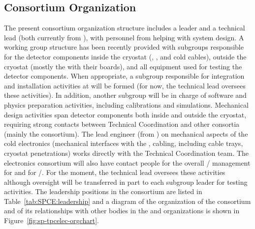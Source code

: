 \subsection{Consortium Organization}
\label{sec:fdsp-tpcelec-management-consort}

The present consortium organization
structure includes a leader and a technical lead (both currently
from ), with personnel from  helping with system design. A working group structure has been recently 
provided with subgroups responsible for the detector 
components inside the cryostat (, , and
cold cables), outside the cryostat (mostly the  with 
their boards), and all equipment
used for testing the detector components. When appropriate, a subgroup
responsible for integration and installation activities at
 will be formed (for now, the technical lead oversees 
these activities). In addition,
another subgroup will be in charge of software and physics
preparation activities, including calibrations and simulations.
Mechanical design activities span detector components both inside
and outside the cryostat, requiring strong contacts between 
Technical Coordination and other consortia (mainly the 
consortium). The lead engineer (from ) on mechanical aspects of the cold
electronics (mechanical interfaces with the , cabling, including 
cable trays, cryostat penetrations) works directly with
the Technical Coordination team. The  electronics consortium will also have 
contact people for the overall / management for
 and for /. For the moment, the technical lead oversees these activities although oversight
will be transferred in part to each subgroup leader for testing
activities. The leadership positions in the consortium 
are listed in Table~\ref{tab:SPCE:leadership} and a diagram of
the organization of the consortium and of its relationships
with other bodies in the  and  organizations
is shown in Figure~\ref{fig:sp-tpcelec-orgchart}.

